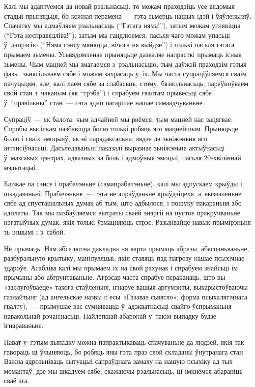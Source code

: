 Калі мы адаптуемся да новай рэальнасьці, то можам праходзіць усе вядомыя стадыі прыняцьця, бо кожная перамена~--- гэта сьмерць нашых ідэй і ўяўленьняў. Спачатку мы адмаўляем рэальнасьць (``Гэтага няма!''), затым можам угнявіцца (``Гэта несправядліва!''), затым мы гандлюемся, пасьля чаго можам упасьці ў~дэпрэсію (``Няма сэнсу мяняцца, нічога ня выйдзе'') і толькі пасьля гэтага прымаем зьмены. Усьвядомленае прыняцьце дазваляе напрасткі прымаць існыя зьмены. Чым мацней мы змагаемся з~рэальнасьцю, тым даўжэй праходзім гэтыя фазы, зьнясільваем сябе і можам захрасаць у~іх. Мы часта супраціўляемся сваім пачуцьцям, але, калі лаем сябе за слабасьць, стому, бязвольнасьць, параўноўваем свой стан з~чаканым (як ``трэба'') і спрабуем гвалтам прывесьці сябе ў~``правільны'' стан~--- гэта адно пагаршае нашае самаадчуваньне.

Супраціў~--- як балота: чым адчайней мы рвёмся, тым мацней нас зацягвае. Спробы высілкам пазбавіцца болю толькі робяць яго мацнейшым. Прыняцьце болю і сваіх эмоцыяў, як ні парадаксальна, вядзе да зьніжэньня яго інтэнсіўнасьці. Дасьледаваньні паказалі выразнае зьніжэньне актыўнасьці ў~мазгавых цэнтрах, адказных за боль і адмоўныя эмоцыі, пасьля 20-хвіліннай мэдытацыі.

Блізкае па сэнсе і прабачэньне (самапрабачэньне), калі мы адпускаем крыўды і шкадаваньні. Прабачэньне~--- гэта не апраўданьне крыўдзіцеля, а~вызваленьне сябе ад спусташальных думак аб тым, што адбылося, і пошуку пакараньня або адплаты. Так мы пазбаўляемся вытраты сваёй энэргіі на пустое пракручваньне нэгатыўных думак, якія толькі ўзмацняюць стрэс. Разьвівайце навык прымірэньня зь іншымі і з~сабой.

Не прымаць. Нам абсалютна дакладна ня варта прымаць абразы, абясцэньваньне, разбуральную крытыку, маніпуляцыі, якія ставяць пад пагрозу нашае псыхічнае здароўе. Асабліва калі мы прымаем іх на свой рахунак і спрабуем знайсьці ім прычыны або абгрунтаваньне. Агрэсар часта спрабуе пераканаць, што вы «заслугоўваеце» такога стаўленьня, ігнаруе вашыя аргумэнты, выкарыстоўваючы газлайтынг (ад ангельскае назвы п'есы «Газавае сьвятло»; форма псыхалягічнага гвалту),~--- прымушае вас сумнявацца ў~адэкватнасьці свайго ўспрыманьня навакольнай рэчаіснасьці. Найлепшай абаронай у~такім выпадку будзе ігнараваньне.

Нават у~гэтым выпадку можна папрактыкаваць спачуваньне да людзей, якія так гавораць ці ўчыняюць, бо робяць яны гэта праз свой складаны ўнутранага стан. Важна адрозьніваць сытуацыі сапраўднага замаху на нашую псыхіку ад тых момантаў, дзе мы шкадуем сябе, скажаючы рэальнасьць, ці імкнёмся абараніць сваё эга.

